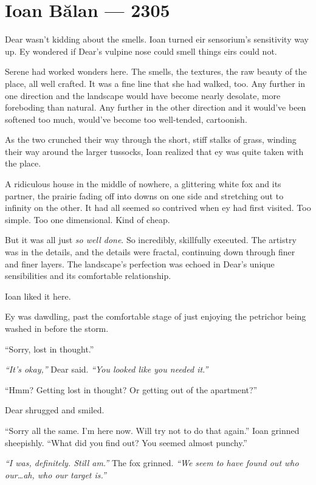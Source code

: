 \hypertarget{ioan-bux103lan-2305}{%
\chapter*{Ioan Bălan — 2305}\label{ioan-bux103lan-2305}}

Dear wasn't kidding about the smells. Ioan turned eir sensorium's sensitivity way up. Ey wondered if Dear's vulpine nose could smell things eirs could not.

Serene had worked wonders here. The smells, the textures, the raw beauty of the place, all well crafted. It was a fine line that she had walked, too. Any further in one direction and the landscape would have become nearly desolate, more foreboding than natural. Any further in the other direction and it would've been softened too much, would've become too well-tended, cartoonish.

As the two crunched their way through the short, stiff stalks of grass, winding their way around the larger tussocks, Ioan realized that ey was quite taken with the place.

A ridiculous house in the middle of nowhere, a glittering white fox and its partner, the prairie fading off into downs on one side and stretching out to infinity on the other. It had all seemed so contrived when ey had first visited. Too simple. Too one dimensional. Kind of cheap.

But it was all just \emph{so well done}. So incredibly, skillfully executed. The artistry was in the details, and the details were fractal, continuing down through finer and finer layers. The landscape's perfection was echoed in Dear's unique sensibilities and its comfortable relationship.

Ioan liked it here.

Ey was dawdling, past the comfortable stage of just enjoying the petrichor being washed in before the storm.

``Sorry, lost in thought.''

\emph{``It's okay,''} Dear said. \emph{``You looked like you needed it.''}

``Hmm? Getting lost in thought? Or getting out of the apartment?''

Dear shrugged and smiled.

``Sorry all the same. I'm here now. Will try not to do that again.'' Ioan grinned sheepishly. ``What did you find out? You seemed almost punchy.''

\emph{``I was, definitely. Still am.''} The fox grinned. \emph{``We seem to have found out who our\ldots{}ah, who our target is.''}

